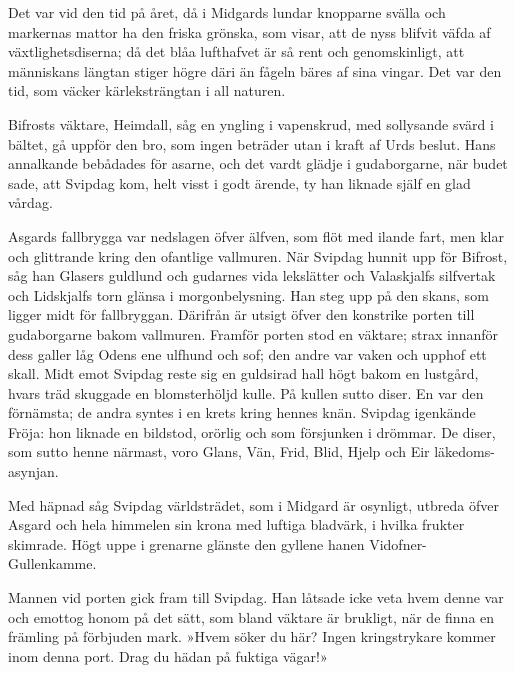 Det var vid den tid på året, då i Midgards lundar knopparne svälla och
markernas mattor ha den friska grönska, som visar, att de nyss blifvit
väfda af växtlighetsdiserna; då det blåa lufthafvet är så rent och
genomskinligt, att människans längtan stiger högre däri än fågeln bäres
af sina vingar. Det var den tid, som väcker kärleksträngtan i all
naturen.

Bifrosts väktare, Heimdall, såg en yngling i vapenskrud, med sollysande
svärd i bältet, gå uppför den bro, som ingen beträder utan i kraft af
Urds beslut. Hans annalkande bebådades för asarne, och det vardt glädje
i gudaborgarne, när budet sade, att Svipdag kom, helt visst i godt
ärende, ty han liknade själf en glad vårdag.

Asgards fallbrygga var nedslagen öfver älfven, som flöt med ilande fart,
men klar och glittrande kring den ofantlige vallmuren. När Svipdag
hunnit upp för Bifrost, såg han Glasers guldlund och gudarnes vida
lekslätter och Valaskjalfs silfvertak och Lidskjalfs torn glänsa i
morgonbelysning. Han steg upp på den skans, som ligger midt för
fallbryggan. Därifrån är utsigt öfver den konstrike porten till
gudaborgarne
\protect\hypertarget{lb1625905.xhtmlux5cux23start126}{}{}\protect\hypertarget{lb1625905.xhtmlux5cux23start126-a}{}{}\protect\hypertarget{lb1625905.xhtmlux5cux23start126-b}{}{}\protect\hypertarget{lb1625905.xhtmlux5cux23start126-c}{}{}\protect\hypertarget{lb1625905.xhtmlux5cux23start126-d}{}{}
bakom vallmuren. Framför porten stod en väktare; strax innanför dess
galler låg Odens ene ulfhund och sof; den andre var vaken och upphof ett
skall. Midt emot Svipdag reste sig en guldsirad hall högt bakom en
lustgård, hvars träd skuggade en blomsterhöljd kulle. På kullen sutto
diser. En var den förnämsta; de andra syntes i en krets kring hennes
knän. Svipdag igenkände Fröja: hon liknade en bildstod, orörlig och som
försjunken i drömmar. De diser, som sutto henne närmast, voro Glans,
Vän, Frid, Blid, Hjelp och Eir läkedoms-asynjan.

Med häpnad såg Svipdag världsträdet, som i Midgard är osynligt, utbreda
öfver Asgard och hela himmelen sin krona med luftiga bladvärk, i hvilka
frukter skimrade. Högt uppe i grenarne glänste den gyllene hanen
Vidofner-Gullenkamme.

Mannen vid porten gick fram till Svipdag. Han låtsade icke veta hvem
denne var och emottog honom på det sätt, som bland väktare är brukligt,
när de finna en främling på förbjuden mark. »Hvem söker du här? Ingen
kringstrykare kommer inom denna port. Drag du hädan på fuktiga vägar!»

